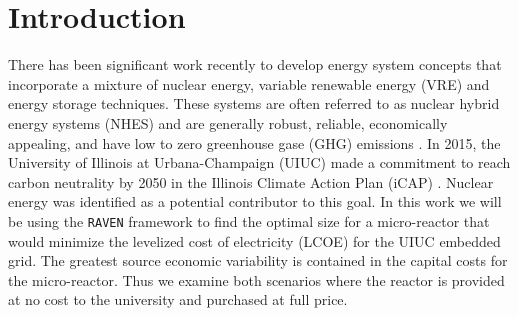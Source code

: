 \section{Introduction}

There has been significant work recently to develop energy system concepts that incorporate a mixture of nuclear energy, variable renewable energy (VRE) and energy storage techniques. These systems are often referred to as nuclear hybrid energy systems (NHES) and are generally robust, reliable, economically appealing, and have low to zero greenhouse gase (GHG) emissions \cite{baker_optimal_2018,ruth_nuclear-renewable_2014,ruth_economic_2016,suman_hybrid_2018-1}. In 2015, the University of Illinois at Urbana-Champaign (UIUC) made a commitment to reach carbon neutrality by 2050 in the Illinois Climate Action Plan (iCAP) \cite{isee_illinois_2015}. Nuclear energy was identified as a potential contributor to this goal. In this work we will be using the \texttt{RAVEN} framework to find the optimal size for a micro-reactor that would minimize the levelized cost of electricity (LCOE) for the UIUC embedded grid. The greatest source economic variability is contained in the capital costs for the micro-reactor. Thus we examine both scenarios where the reactor is provided at no cost to the university and purchased at full price. 
